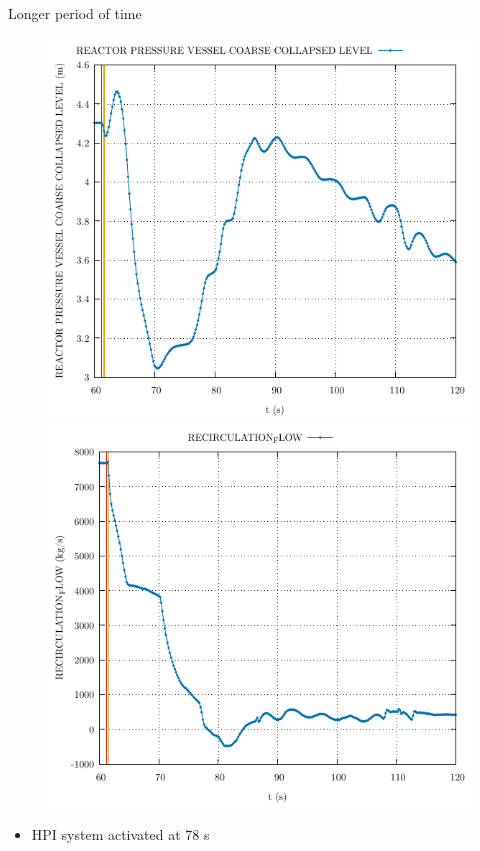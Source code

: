 \begin{frame}{Longer period of time}
\begin{figure}
\begin{minipage}{.5\textwidth}
			\includegraphics[width=0.7\linewidth]{./graphs/REACTOR PRESSURE VESSEL COARSE COLLAPSED LEVEL.pdf}
		\end{minipage}%
			\begin{minipage}{.5\textwidth}
					\centering
					\includegraphics[width=.7\linewidth]{./graphs/RECIRCULATION_FLOW.pdf}
				\end{minipage}
	\end{figure}
	\begin{itemize}
		\item HPI system activated at 78 s
	\end{itemize}
\end{frame}





